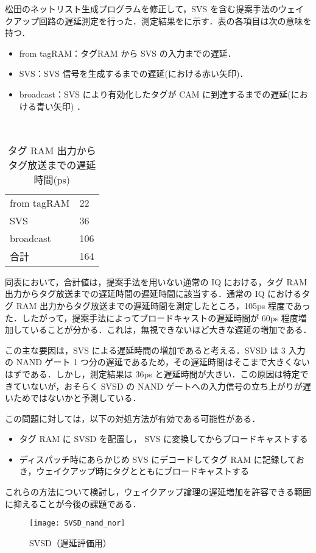 松田のネットリスト生成プログラムを修正して，SVS を含む提案手法のウェイクアップ回路の遅延測定を行った．測定結果をに示す．表の各項目は次の意味を持つ．
  \begin{itemize}
    \item from tagRAM：タグRAM から SVS  の入力までの遅延．
    \item SVS：SVS 信号を生成するまでの遅延(における赤い矢印)．
    \item broadcast：SVS により有効化したタグが CAM に到達するまでの遅延(における青い矢印) ．
  \end{itemize}
　
  \begin{table}[htb]
    \caption{タグ RAM 出力からタグ放送までの遅延時間(ps)}
    \footnotesize
    \center
      \begin{tabular}{l|l} \hline \hline
       from tagRAM & 22 \\
       SVS & 36 \\
       broadcast & 106 \\ \hline
      合計 & 164 \\ \hline
    \end{tabular}
    \label{tab:delay}
  \end{table}

 同表において，合計値は，提案手法を用いない通常の IQ における，タグ RAM 出力からタグ放送までの遅延時間の遅延時間に該当する．通常の IQ におけるタグ RAM 出力からタグ放送までの遅延時間を測定したところ，105ps 程度であった．したがって，提案手法によってブロードキャストの遅延時間が 60ps 程度増加していることが分かる．これは，無視できないほど大きな遅延の増加である．
  
  この主な要因は，SVS による遅延時間の増加であると考える．SVSD は 3 入力の NAND ゲート 1 つ分の遅延であるため，その遅延時間はそこまで大きくないはずである．しかし，測定結果は 36ps と遅延時間が大きい．この原因は特定できていないが，おそらく SVSD の NAND ゲートへの入力信号の立ち上がりが遅いためではないかと予測している．

  この問題に対しては，以下の対処方法が有効である可能性がある．
  \begin{itemize}
  \item タグ RAM に SVSD を配置し， SVS に変換してからブロードキャストする
  \item ディスパッチ時にあらかじめ SVS にデコードしてタグ RAM に記録しておき，ウェイクアップ時にタグとともにブロードキャストする
  \end{itemize}
  これらの方法について検討し，ウェイクアップ論理の遅延増加を許容できる範囲に抑えることが今後の課題である．
  
\begin{figure}[htb]
  \centering
  \texttt{[image: SVSD\_nand\_nor]}
  \caption{SVSD（遅延評価用）}
  \label{fig:SVSD_nand_nor}
\end{figure}

